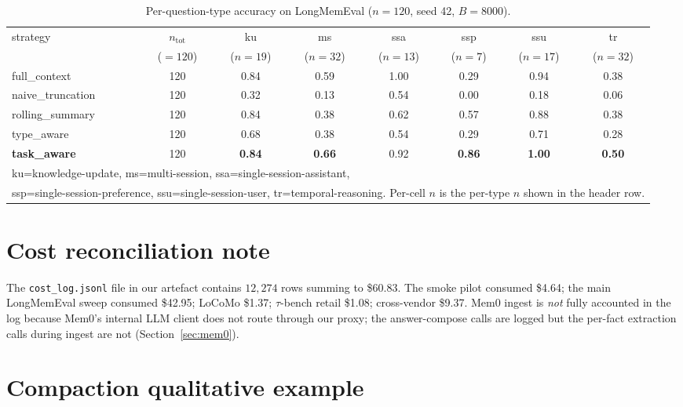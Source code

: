 \documentclass{article}
\begin{document}
\begin{table}[h]
\caption{Per-question-type accuracy on LongMemEval ($n{=}120$, seed 42, $B{=}8000$).}
\label{tab:pertype}
\centering
\small
\begin{tabular}{lccccccc}
\toprule
strategy & $n_{\text{tot}}$ & ku & ms & ssa & ssp & ssu & tr \\
 & ($=120$) & ($n{=}19$) & ($n{=}32$) & ($n{=}13$) & ($n{=}7$) & ($n{=}17$) & ($n{=}32$) \\
\midrule
\textsf{full\_context}     & 120 & 0.84 & 0.59 & 1.00 & 0.29 & 0.94 & 0.38 \\
\textsf{naive\_truncation} & 120 & 0.32 & 0.13 & 0.54 & 0.00 & 0.18 & 0.06 \\
\textsf{rolling\_summary}  & 120 & 0.84 & 0.38 & 0.62 & 0.57 & 0.88 & 0.38 \\
\textsf{type\_aware}       & 120 & 0.68 & 0.38 & 0.54 & 0.29 & 0.71 & 0.28 \\
\textbf{\textsf{task\_aware}} & 120 & \textbf{0.84} & \textbf{0.66} & 0.92 & \textbf{0.86} & \textbf{1.00} & \textbf{0.50} \\
\midrule
\multicolumn{8}{l}{\footnotesize ku=knowledge-update, ms=multi-session, ssa=single-session-assistant,} \\
\multicolumn{8}{l}{\footnotesize ssp=single-session-preference, ssu=single-session-user, tr=temporal-reasoning. Per-cell $n$ is the per-type $n$ shown in the header row.} \\
\bottomrule
\end{tabular}
\end{table}

\section{Cost reconciliation note}\label{app:cost}

The \texttt{cost\_log.jsonl} file in our artefact contains $12{,}274$
rows summing to \$60.83. The smoke pilot consumed \$4.64; the main
LongMemEval sweep consumed \$42.95; LoCoMo \$1.37; $\tau$-bench retail
\$1.08; cross-vendor \$9.37. Mem0 ingest is \emph{not} fully accounted
in the log because Mem0's internal LLM client does not route through our
proxy; the answer-compose calls are logged but the per-fact extraction
calls during ingest are not (Section~\ref{sec:mem0}).

\section{Compaction qualitative example}\label{app:qualitative}
\end{document}
